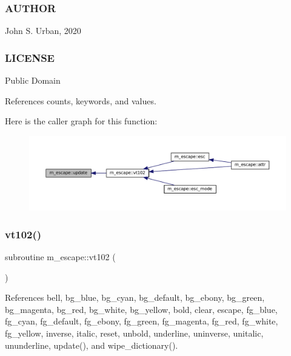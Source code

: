 \subsubsection*{A\+U\+T\+H\+OR}

John S. Urban, 2020 \subsubsection*{L\+I\+C\+E\+N\+SE}

Public Domain 

References counts, keywords, and values.

Here is the caller graph for this function\+:\nopagebreak
\begin{figure}[H]
\begin{center}
\leavevmode
\includegraphics[width=350pt]{namespacem__escape_a5efd612f60d281003917329484a7960c_icgraph}
\end{center}
\end{figure}
\mbox{\label{namespacem__escape_ae9d40717b2e75e90e2505d5fed6435c5}} 
\subsubsection{\texorpdfstring{vt102()}{vt102()}}
{\footnotesize\ttfamily subroutine m\+\_\+escape\+::vt102 (\begin{DoxyParamCaption}{ }\end{DoxyParamCaption})\hspace{0.3cm}{\ttfamily [private]}}



References bell, bg\+\_\+blue, bg\+\_\+cyan, bg\+\_\+default, bg\+\_\+ebony, bg\+\_\+green, bg\+\_\+magenta, bg\+\_\+red, bg\+\_\+white, bg\+\_\+yellow, bold, clear, escape, fg\+\_\+blue, fg\+\_\+cyan, fg\+\_\+default, fg\+\_\+ebony, fg\+\_\+green, fg\+\_\+magenta, fg\+\_\+red, fg\+\_\+white, fg\+\_\+yellow, inverse, italic, reset, unbold, underline, uninverse, unitalic, ununderline, update(), and wipe\+\_\+dictionary().

